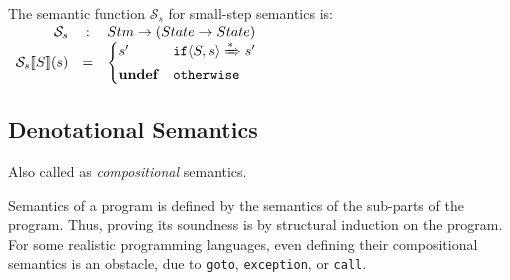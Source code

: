 The semantic function $\mathcal{S}_s$ for small-step semantics is:
\begin{math}
  \begin{array}{rcl}
    \mathcal{S}_s & : & Stm \to (State \to State) \\
    \mathcal{S}_s \llbracket S \rrbracket (s) & = &
                                    \begin{cases}
                                      s' & \mathtt{if} \langle S, s \rangle \xRightarrow{*} s' \\
                                      \mathbf{undef} & \mathtt{otherwise}
                                    \end{cases}

  \end{array}
\end{math}


\subsection{Denotational Semantics}
Also called as \textit{compositional} semantics.

Semantics of a program is defined by the semantics of the sub-parts of
the program. Thus, proving its soundness is by structural induction on
the program. For some realistic programming languages, even defining
their compositional semantics is an obstacle, due to \texttt{goto},
\texttt{exception}, or \texttt{call}.


